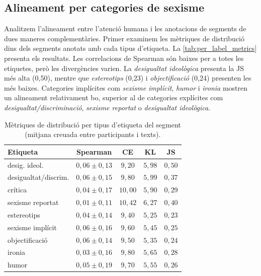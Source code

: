 \subsection{Alineament per categories de sexisme}

Analitzem l'alineament entre l'atenció humana i les anotacions de segments de dues maneres complementàries.
Primer examinem les mètriques de distribució dins dels segments anotats amb cada tipus d'etiqueta.
La \autoref{tab:per_label_metrics} presenta els resultats.
Les correlacions de Spearman són baixes per a totes les etiquetes, però les divergències varien.
La \textit{desigualtat ideològica} presenta la JS més alta (0,50), mentre que \textit{estereotips} (0,23) i \textit{objectificació} (0,24) presenten les més baixes.
Categories implícites com \textit{sexisme implícit}, \textit{humor} i \textit{ironia} mostren un alineament relativament bo, superior al de categories explícites com \textit{desigualtat/discriminació}, \textit{sexisme reportat} o \textit{desigualtat ideològica}.

\iftables
\begin{table}[htbp]
\small
\centering
\begin{tabular}{lcccc}
\toprule
\textbf{Etiqueta} & \textbf{Spearman} & \textbf{CE} & \textbf{KL} & \textbf{JS} \\
\midrule
desig. ideol.           & $0,06 \pm 0,13$ & $9,20$ & $5,98$ & $0,50$ \\
desigualtat/discrim.    & $0,06 \pm 0,15$ & $9,80$ & $5,99$ & $0,37$ \\
crítica                 & $0,04 \pm 0,17$ & $10,00$ & $5,90$ & $0,29$ \\
sexisme reportat        & $0,01 \pm 0,11$ & $10,42$ & $6,27$ & $0,40$ \\
estereotips             & $0,04 \pm 0,14$ & $9,40$ & $5,25$ & $0,23$ \\
sexisme implícit        & $0,06 \pm 0,16$ & $9,60$ & $5,45$ & $0,25$ \\
objectificació          & $0,06 \pm 0,14$ & $9,50$ & $5,35$ & $0,24$ \\
ironia                  & $0,03 \pm 0,16$ & $9,80$ & $5,65$ & $0,28$ \\
humor                   & $0,05 \pm 0,19$ & $9,70$ & $5,55$ & $0,26$ \\
\bottomrule
\end{tabular}
\caption{Mètriques de distribució per tipus d'etiqueta del segment (mitjana creuada entre participants i texts).}
\label{tab:per_label_metrics}
\end{table}
\fi


